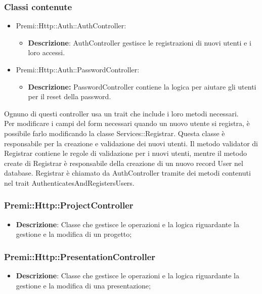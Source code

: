 	\subsubsection*{Classi contenute}
		\begin{itemize}
			\item Premi::Http::Auth::AuthController:
				\begin{itemize}
					\item \textbf{Descrizione}: AuthController gestisce le registrazioni di nuovi utenti e i loro accessi.
				\end{itemize}
			\item Premi::Http::Auth::PasswordController:
				\begin{itemize}
					\item \textbf{Descrizione:} PasswordController contiene la logica per aiutare gli utenti per il reset della password.
				\end{itemize}
		\end{itemize}
	Ognuno di questi controller usa un trait che include i loro metodi necessari.\\
	Per modificare i campi del form necessari quando un nuovo utente si registra, è possibile farlo modificando la classe Services::Registrar. Questa classe è responsabile per la creazione e validazione dei nuovi utenti. Il metodo validator di Registrar contiene le regole di validazione per i nuovi utenti, mentre il metodo create di Registrar è responsabile della creazione di un nuovo record User nel database. Registrar è chiamato da AuthController tramite dei metodi contenuti nel trait AuthenticatesAndRegistersUsers.
			
	\subsubsection*{Premi::Http::ProjectController}
			\begin{itemize}
				\item \textbf{Descrizione}: Classe che gestisce le operazioni e la logica riguardante la gestione e la modifica di un progetto;
			\end{itemize}
			
   \subsubsection*{Premi::Http::PresentationController}
			\begin{itemize}
				\item \textbf{Descrizione}: Classe che gestisce le operazioni e la logica riguardante la gestione e la modifica di una presentazione;
			\end{itemize}
			
